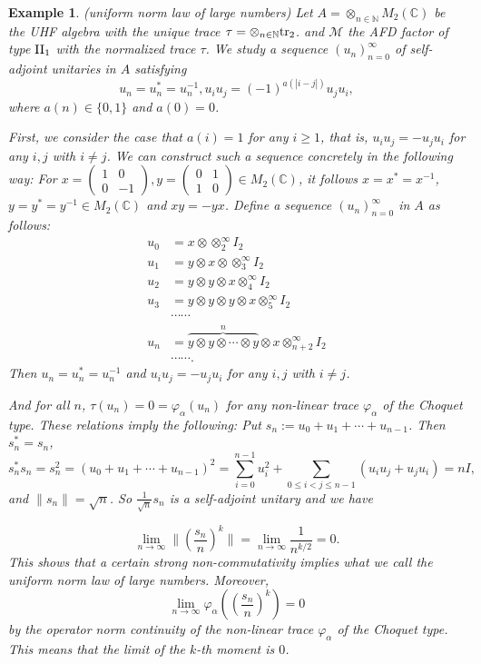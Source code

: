 \documentclass[a4paper,12pt]{amsart}
\newtheorem{example}[definition]{Example}
\newcommand{\M}{\mathcal{M}}
\newcommand{\C}{\mathbb{C}}
\newcommand{\N}{\mathbb{N}}
\begin{document}
\begin{example} \rm (uniform norm law of large numbers)
Let $A = \otimes_{n \in \N}M_2(\C)$ be the UHF algebra with the unique trace 
$\tau=\otimes_{n\in \N} {\rm tr}_2$.  and  $\M$ the AFD factor of type ${\rm II}_1$ 
with the normalized trace $\tau$.
We study a sequence $(u_n)_{n=0}^\infty$ of self-adjoint unitaries in $A$ satisfying 
\[  u_n=u_n^* = u_n^{-1},  u_iu_j= (-1)^{a(|i-j|)}u_ju_i ,  \]
where $a(n) \in \{0,1\}$ and $a(0)=0$. 


First, we consider the case that $a(i)=1$ for any $i\ge 1$, that is, $u_iu_j=-u_ju_i$ for any $i,j$ with $i \not=j$. 
We can construct such a sequence concretely in the following way:
For $ x = \begin{pmatrix} 1 & 0 \\ 0 & -1 \end{pmatrix},  y=\begin{pmatrix}  0 & 1 \\ 1 & 0 \end{pmatrix} \in M_2(\mathbb{C})$,
it follows $x=x^*=x^{-1}$, $y=y^*=y^{-1} \in M_2(\mathbb{C})$ and $xy=-yx$. 
Define a sequence $(u_n)_{n=0}^\infty$ in $A$ as follows:
\begin{align*}
  u_0 & = x\otimes \otimes_2^\infty I_2\\
  u_1 & = y \otimes x \otimes \otimes_3^\infty I_2  \\
  u_2 & = y \otimes y \otimes x \otimes_4^\infty I_2 \\
  u_3 & = y \otimes y \otimes y \otimes x \otimes_5^\infty I_2 \\
       & \cdots \cdots \\
  u_n & = \overbrace{y\otimes y \otimes \cdots \otimes y}^n \otimes x \otimes_{n+2}^\infty I_2 \\
       & \cdots \cdots .
\end{align*}
Then $u_n=u_n^* = u_n^{-1}$ and $u_iu_j= -u_ju_i$ for any $i,j$ with $i\neq j$. 


And for all $n$, $\tau(u_n) = 0 =  \varphi_\alpha(u_n)$ for any non-linear trace $\varphi_\alpha$ of the Choquet type. 
These relations imply the following: Put $s_n := u_0+u_1+\cdots +u_{n-1}$. Then $s_n^*= s_n$,  
\[ s_n^*s_n =s_n^2 = (u_0+u_1+\cdots +u_{n-1})^2 = \sum_{i=0}^{n-1}u_i^2 + \sum_{0\le i <j \le n-1}(u_iu_j + u_ju_i) = nI,   \]
and $\|s_n\| = \sqrt{n}$.
So $\frac{1}{\sqrt{n}} s_n$ is a self-adjoint unitary and  we have

\[   \lim_{n\to\infty} \|(\frac{s_n}{n})^k\|= \lim_{n\to \infty} \frac{1}{n^{k/2}} = 0.    \]
\noindent
This shows that a certain strong non-commutativity implies what we call {\it the uniform norm law of large numbers}. 
Moreover, 
\[   \lim_{n\to\infty} \varphi_\alpha((\frac{s_n}{n})^k)=0   \]
by the operator norm continuity of the non-linear trace $\varphi_\alpha$ of the Choquet type.
This means that the limit of the $k$-th moment is $0$.


\end{example}
\end{document}
